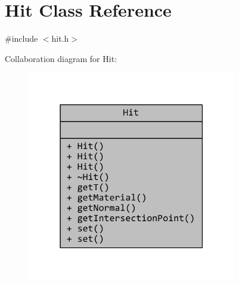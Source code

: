 \hypertarget{classHit}{\section{Hit Class Reference}
\label{classHit}
}


{\ttfamily \#include $<$hit.\+h$>$}



Collaboration diagram for Hit\+:
\nopagebreak
\begin{figure}[H]
\begin{center}
\leavevmode
\includegraphics[width=259pt]{classHit__coll__graph}
\end{center}
\end{figure}
